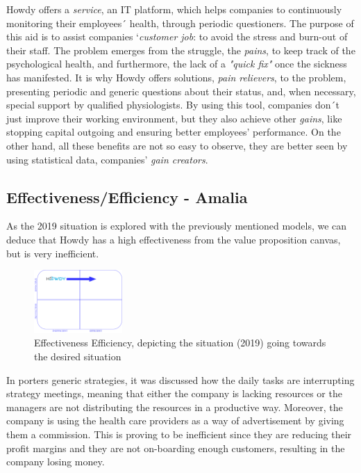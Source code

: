 \noindent Howdy offers a \textit{service}, an IT platform, which helps companies to continuously monitoring their employees´ health, through periodic questioners. The purpose of this aid is to assist companies ‘\textit{customer job}: to avoid the stress and burn-out of their staff. 
The problem emerges from the struggle, the \textit{pains}, to keep track of the psychological health, and furthermore, the lack of a \textit{"quick fix"} once the sickness has manifested. It is why Howdy offers solutions, \textit{pain relievers}, to the problem, presenting periodic and generic questions about their status, and, when necessary, special support by qualified physiologists.    
By using this tool, companies don´t just improve their working environment, but they also achieve other \textit{gains}, like stopping capital outgoing and ensuring better employees’ performance. On the other hand, all these benefits are not so easy to observe, they are better seen by using statistical data, companies’ \textit{gain creators}.





\subsection{Effectiveness/Efficiency - Amalia }

As the 2019 situation is explored with the previously mentioned models, we can deduce that Howdy has a high effectiveness from the value proposition canvas, but is very inefficient. 

\begin{figure}
\centering
\includegraphics[width=0.3\textwidth]{figures/effiTEMO.png}
\caption{Effectiveness Efficiency, depicting the situation (2019) going towards the desired situation}
\label{fig:eff}
\end{figure}

\noindent In porters generic strategies, it was discussed how the daily tasks are interrupting strategy meetings, meaning that either the company is lacking resources or the managers are not distributing the resources in a productive way. Moreover, the company is using the health care providers as a way of advertisement by giving them a commission. This is proving to be inefficient since they are reducing their profit margins and they are not on-boarding enough customers, resulting in the company losing money.

